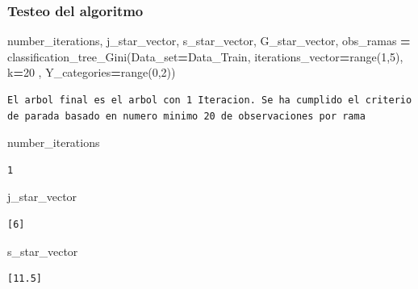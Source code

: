 \documentclass[
  11pt,
  a4paper,
]{article}
\newenvironment{Shaded}{\begin{snugshade}}{\end{snugshade}}
\newcommand{\BuiltInTok}[1]{#1}
\newcommand{\DecValTok}[1]{\textcolor[rgb]{0.00,0.00,0.81}{#1}}
\newcommand{\NormalTok}[1]{#1}
\newcommand{\OperatorTok}[1]{\textcolor[rgb]{0.81,0.36,0.00}{\textbf{#1}}}
\begin{document}
\hypertarget{testeo-del-algoritmo}{%
\subsubsection{Testeo del algoritmo}\label{testeo-del-algoritmo}}

\begin{Shaded}
\begin{Highlighting}[]
\NormalTok{number\_iterations, j\_star\_vector, s\_star\_vector, G\_star\_vector, obs\_ramas }\OperatorTok{=}\NormalTok{ classification\_tree\_Gini(Data\_set}\OperatorTok{=}\NormalTok{Data\_Train, iterations\_vector}\OperatorTok{=}\BuiltInTok{range}\NormalTok{(}\DecValTok{1}\NormalTok{,}\DecValTok{5}\NormalTok{), k}\OperatorTok{=}\DecValTok{20}\NormalTok{ , Y\_categories}\OperatorTok{=}\BuiltInTok{range}\NormalTok{(}\DecValTok{0}\NormalTok{,}\DecValTok{2}\NormalTok{))}
\end{Highlighting}
\end{Shaded}

\begin{verbatim}
El arbol final es el arbol con 1 Iteracion. Se ha cumplido el criterio de parada basado en numero minimo 20 de observaciones por rama
\end{verbatim}

\begin{Shaded}
\begin{Highlighting}[]
\NormalTok{number\_iterations}
\end{Highlighting}
\end{Shaded}

\begin{verbatim}
1
\end{verbatim}

\begin{Shaded}
\begin{Highlighting}[]
\NormalTok{j\_star\_vector}
\end{Highlighting}
\end{Shaded}

\begin{verbatim}
[6]
\end{verbatim}

\begin{Shaded}
\begin{Highlighting}[]
\NormalTok{s\_star\_vector}
\end{Highlighting}
\end{Shaded}

\begin{verbatim}
[11.5]
\end{verbatim}
\end{document}
